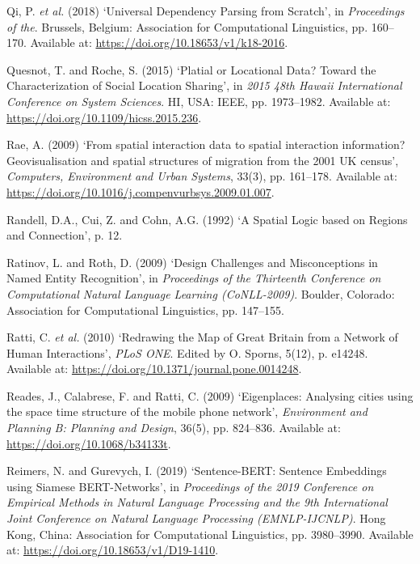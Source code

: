 \documentclass[
  letterpaper,
  11pt,
  english,
  onehalfspacing,
  headsepline]{MastersDoctoralThesis}
\newlength{\cslhangindent}
\newlength{\cslentryspacingunit} %
\newenvironment{CSLReferences}[2] %
 {%
  \setlength{\parindent}{0pt}
  \ifodd #1
  \let\oldpar\par
  \def\par{\hangindent=\cslhangindent\oldpar}
  \fi
  \setlength{\parskip}{#2\cslentryspacingunit}
 }%
 {}
\begin{document}
\begin{CSLReferences}{0}{0}
\leavevmode{}%
Qi, P. \emph{et al.} (2018) {`Universal {Dependency Parsing} from
{Scratch}'}, in \emph{Proceedings of the}. {Brussels, Belgium}:
{Association for Computational Linguistics}, pp. 160--170. Available at:
\url{https://doi.org/10.18653/v1/k18-2016}.

\leavevmode{}%
Quesnot, T. and Roche, S. (2015) {`Platial or {Locational Data}?
{Toward} the {Characterization} of {Social Location Sharing}'}, in
\emph{2015 48th {Hawaii International Conference} on {System Sciences}}.
{HI, USA}: {IEEE}, pp. 1973--1982. Available at:
\url{https://doi.org/10.1109/hicss.2015.236}.

\leavevmode{}%
Rae, A. (2009) {`From spatial interaction data to spatial interaction
information? {Geovisualisation} and spatial structures of migration from
the 2001 {UK} census'}, \emph{Computers, Environment and Urban Systems},
33(3), pp. 161--178. Available at:
\url{https://doi.org/10.1016/j.compenvurbsys.2009.01.007}.

\leavevmode{}%
Randell, D.A., Cui, Z. and Cohn, A.G. (1992) {`A {Spatial Logic} based
on {Regions} and {Connection}'}, p. 12.

\leavevmode{}%
Ratinov, L. and Roth, D. (2009) {`Design {Challenges} and
{Misconceptions} in {Named Entity Recognition}'}, in \emph{Proceedings
of the {Thirteenth Conference} on {Computational Natural Language
Learning} ({CoNLL-2009})}. {Boulder, Colorado}: {Association for
Computational Linguistics}, pp. 147--155.

\leavevmode{}%
Ratti, C. \emph{et al.} (2010) {`Redrawing the {Map} of {Great Britain}
from a {Network} of {Human Interactions}'}, \emph{PLoS ONE}. Edited by
O. Sporns, 5(12), p. e14248. Available at:
\url{https://doi.org/10.1371/journal.pone.0014248}.

\leavevmode{}%
Reades, J., Calabrese, F. and Ratti, C. (2009) {`Eigenplaces: Analysing
cities using the space {\textendash} time structure of the mobile phone
network'}, \emph{Environment and Planning B: Planning and Design},
36(5), pp. 824--836. Available at:
\url{https://doi.org/10.1068/b34133t}.

\leavevmode{}%
Reimers, N. and Gurevych, I. (2019) {`Sentence-{BERT}: {Sentence
Embeddings} using {Siamese BERT-Networks}'}, in \emph{Proceedings of the
2019 {Conference} on {Empirical Methods} in {Natural Language
Processing} and the 9th {International Joint Conference} on {Natural
Language Processing} ({EMNLP-IJCNLP})}. {Hong Kong, China}: {Association
for Computational Linguistics}, pp. 3980--3990. Available at:
\url{https://doi.org/10.18653/v1/D19-1410}.


\end{CSLReferences}
\end{document}
